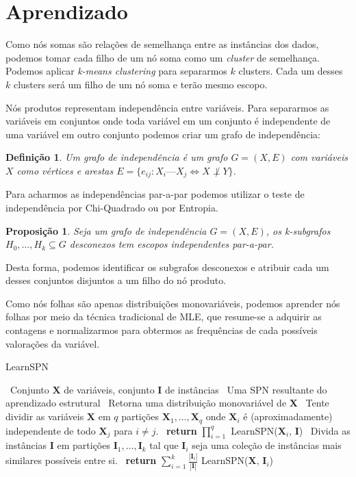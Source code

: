 \documentclass{amsart}
\theoremstyle{plain}
\newcounter{dummy-def}\numberwithin{dummy-def}{section}
\newtheorem{definition}[dummy-def]{Definição}
\newcounter{dummy-thm}\numberwithin{dummy-thm}{section}
\newcounter{dummy-prop}\numberwithin{dummy-prop}{section}
\newtheorem{proposition}[dummy-prop]{Proposição}
\newcounter{dummy-ex}\numberwithin{dummy-ex}{section}
\newcounter{dummy-eg}\numberwithin{dummy-eg}{section}
\numberwithin{equation}{section}
\newcommand{\set}[1]{\mathbf{#1}}
\begin{document}
\section{Aprendizado}

Como nós somas são relações de semelhança entre as instâncias dos dados, podemos tomar cada filho
de um nó soma como um \textit{cluster} de semelhança. Podemos aplicar \textit{k-means clustering}
para separarmos $k$ clusters. Cada um desses $k$ clusters será um filho de um nó soma e terão mesmo
escopo.

Nós produtos representam independência entre variáveis. Para separarmos as variáveis em conjuntos
onde toda variável em um conjunto é independente de uma variável em outro conjunto podemos criar um
grafo de independência:

\begin{definition}
  Um grafo de independência é um grafo $G=(X,E)$ com variáveis $X$ como vértices e arestas
  $E=\{e_{ij} : X_i\text{---}X_j \iff X \not\perp Y\}$.
\end{definition}

Para acharmos as independências par-a-par podemos utilizar o teste de independência por
Chi-Quadrado ou por Entropia.

\begin{proposition}
  Seja um grafo de independência $G=(X,E)$, os k-subgrafos $H_0,\ldots,H_k \subseteq G$
  desconexos tem escopos independentes par-a-par.
\end{proposition}

Desta forma, podemos identificar os subgrafos desconexos e atribuir cada um desses conjuntos
disjuntos a um filho do nó produto.

Como nós folhas são apenas distribuições monovariáveis, podemos aprender nós folhas por meio da
técnica tradicional de MLE, que resume-se a adquirir as contagens e normalizarmos para obtermos
as frequências de cada possíveis valorações da variável.

\begin{algorithm}[H]
  \caption{LearnSPN~\cite{gens-domingos}}\label{learn-alg}
  \begin{algorithmic}[1]
    \Require~Conjunto $\set{X}$ de variáveis, conjunto $\set{I}$ de instâncias
    \Ensure~Uma SPN resultante do aprendizado estrutural
    \If{$|\set{X}|=1$}
      \State~Retorna uma distribuição monovariável de $\set{X}$
    \EndIf
    \State~Tente dividir as variáveis $\set{X}$ em $q$ partições $\set{X}_1,\ldots,\set{X}_q$
      onde $\set{X}_i$ é (aproximadamente) independente de todo $\set{X}_j$ para $i\neq j$.
      \State~\textbf{return} $\prod_{i=1}^q$ LearnSPN($\set{X}_i$, $\set{I}$)
    \Else
      \State~Divida as instâncias $\set{I}$ em partições $\set{I}_1,\ldots,\set{I}_k$ tal que
        $\set{I}_i$ seja uma coleção de instâncias mais similares possíveis entre si.
      \State~\textbf{return} $\sum_{i=1}^k \frac{|\set{I}_i|}{|\set{I}|}$ LearnSPN($\set{X}$,
        $\set{I}_i$)
    \EndIf
  \end{algorithmic}
\end{algorithm}
\end{document}
